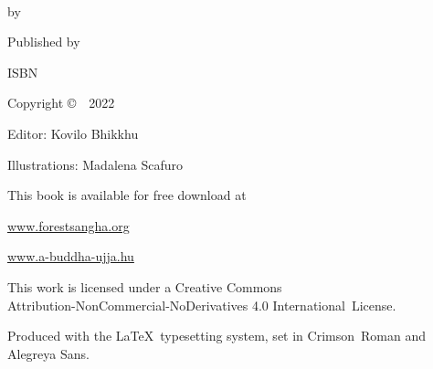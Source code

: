 \cleartoverso
\thispagestyle{empty}

{\copyrightsize
\centering
\setlength{\parindent}{0pt}%
\setlength{\parskip}{0.8\baselineskip}%

\thetitle\\
by \theauthor

Published by \thePublisher

ISBN \theISBN

Copyright \copyright\ \theauthor\ 2022

Editor: Kovilo Bhikkhu

Illustrations: Madalena Scafuro

This book is available for free download at

\href{https://forestsangha.org/}{www.forestsangha.org}

\href{https://a-buddha-ujja.hu/}{www.a-buddha-ujja.hu}

\vfill

This work is licensed under a Creative Commons\\
Attribution-NonCommercial-NoDerivatives 4.0 International~License.

Produced with the \LaTeX\ typesetting system, set in Crimson~Roman and Alegreya Sans.

\theEditionInfo

}
